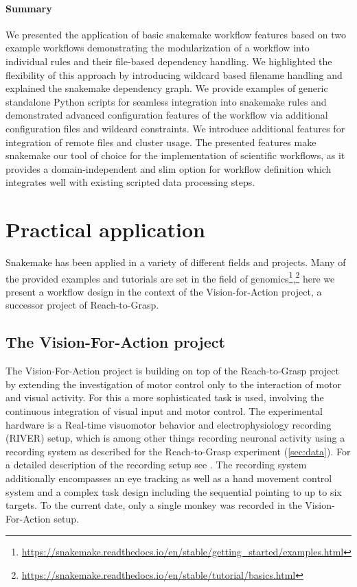 \paragraph{Summary}
We presented the application of basic snakemake workflow features based on two example workflows demonstrating the modularization of a workflow into individual rules and their file-based dependency handling. We highlighted the flexibility of this approach by introducing wildcard based filename handling and explained the snakemake dependency graph. We provide examples of generic standalone Python scripts for seamless integration into snakemake rules and demonstrated advanced configuration features of the workflow via additional configuration files and wildcard constraints. We introduce additional features for integration of remote files and cluster usage.
The presented features make snakemake our tool of choice for the implementation of scientific workflows, as it provides a domain-independent and slim option for workflow definition which integrates well with existing scripted data processing steps.


\section{Practical application}
Snakemake has been applied in a variety of different fields and projects. Many of the provided examples and tutorials are set in the field of genomics\footnote{\url{https://snakemake.readthedocs.io/en/stable/getting_started/examples.html}},\footnote{\url{https://snakemake.readthedocs.io/en/stable/tutorial/basics.html}} here we present a workflow design in the context of the Vision-for-Action project, a successor project of Reach-to-Grasp.

\subsection{The Vision-For-Action project}
The Vision-For-Action project is building on top of the Reach-to-Grasp project by extending the investigation of motor control only to the interaction of motor and visual activity. For this a more sophisticated task is used, involving the continuous integration of visual input and motor control. The experimental hardware is a Real-time visuomotor behavior and electrophysiology recording (RIVER) setup, which is among other things recording neuronal activity using a  recording system as described for the Reach-to-Grasp experiment (\cref{sec:data}). For a detailed description of the recording setup see \citet{deHaan_2018,deHaan_2018a}. The recording system additionally encompasses an eye tracking as well as a hand movement control system and a complex task design including the sequential pointing to up to six targets. To the current date, only a single monkey was recorded in the Vision-For-Action setup.

